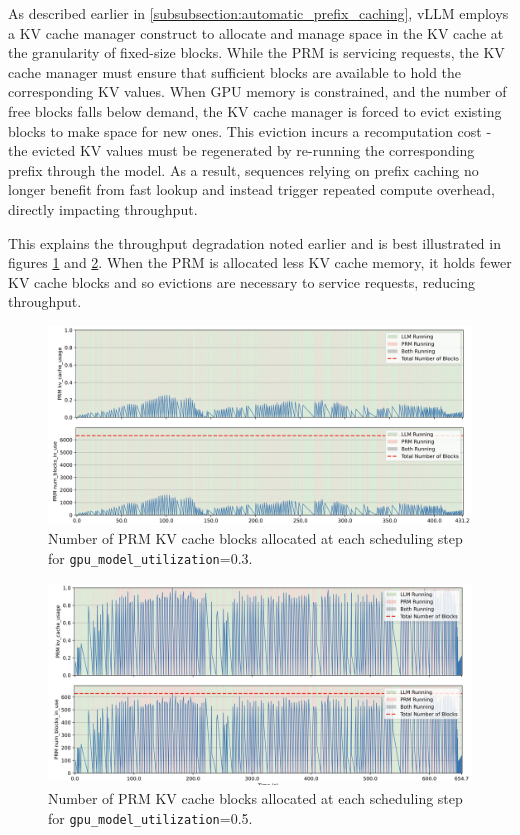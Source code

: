 \documentclass[11pt,twoside]{report}
\begin{document}
As described earlier in \ref{subsubsection:automatic_prefix_caching}, vLLM employs a KV cache manager construct to allocate and manage space in the KV cache at the granularity of fixed-size blocks. 
While the PRM is servicing requests, the KV cache manager must ensure that sufficient blocks are available to hold the corresponding KV values. 
When GPU memory is constrained, and the number of free blocks falls below demand, the KV cache manager is forced to evict existing blocks to make space for new ones. 
This eviction incurs a recomputation cost - the evicted KV values must be regenerated by re-running the corresponding prefix through the model. 
As a result, sequences relying on prefix caching no longer benefit from fast lookup and instead trigger repeated compute overhead, directly impacting throughput.

This explains the throughput degradation noted earlier and is best illustrated in figures \ref{fig:prm_block_usage_low} and \ref{fig:prm_block_usage_high}.
When the PRM is allocated less KV cache memory, it holds fewer KV cache blocks and so evictions are necessary to service requests, reducing throughput.

\begin{figure}[htbp]
  \centering
  \includegraphics[width=\textwidth]{figures/prm_block_usage_low.png}
  \caption{Number of PRM KV cache blocks allocated at each scheduling step for \texttt{gpu\_model\_utilization}=0.3.}
  \label{fig:prm_block_usage_low}
\end{figure}

\begin{figure}[htbp]
  \centering
  \includegraphics[width=\textwidth]{figures/prm_block_usage_high.png}
  \caption{Number of PRM KV cache blocks allocated at each scheduling step for \texttt{gpu\_model\_utilization}=0.5.}
  \label{fig:prm_block_usage_high}
\end{figure}
\end{document}
